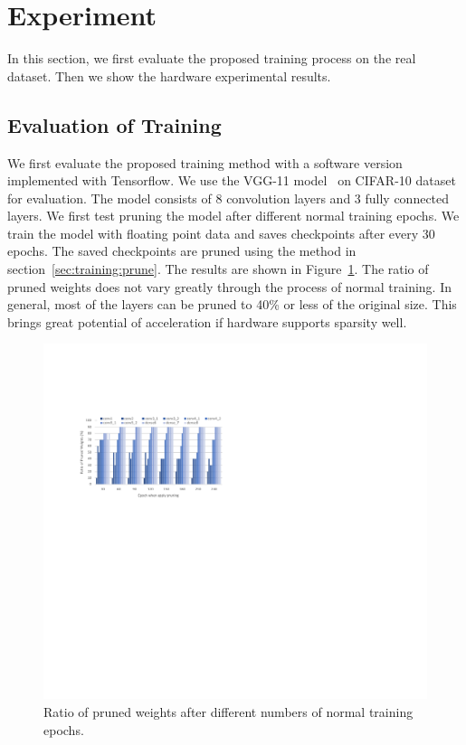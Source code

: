 \section{Experiment}\label{sec:experiment}
In this section, we first evaluate the proposed training process on the real dataset. Then we show the hardware experimental results. 

\subsection{Evaluation of Training}
We first evaluate the proposed training method with a software version implemented with Tensorflow. We use the VGG-11 model~\cite{simonyan2014very} on CIFAR-10 dataset for evaluation. The model consists of 8 convolution layers and 3 fully connected layers. We first test pruning the model after different normal training epochs. We train the model with floating point data and saves checkpoints after every 30 epochs. The saved checkpoints are pruned using the method in section~\ref{sec:training:prune}. The results are shown in Figure~\ref{fig:prune_exp}. The ratio of pruned weights does not vary greatly through the process of normal training. In general, most of the layers can be pruned to 40\% or less of the original size. This brings great potential of acceleration if hardware supports sparsity well.

\begin{figure}[tb]
  \centering
  \includegraphics[width=0.9\columnwidth]{figures/pruning_exp.pdf}
  \caption{Ratio of pruned weights after different numbers of normal training epochs. }
  \label{fig:prune_exp}
\end{figure}


